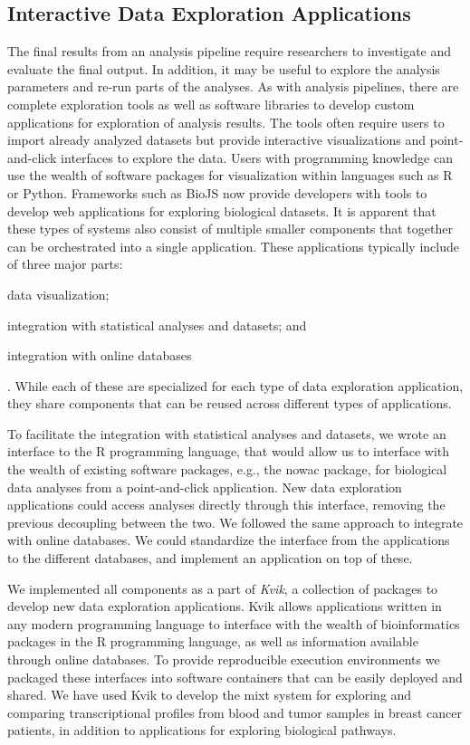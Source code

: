 \subsection{Interactive Data Exploration Applications}
The final results from an analysis pipeline require researchers to investigate
and evaluate the final output. In addition, it may be useful to explore the
analysis parameters and re-run parts of the analyses. 
As with analysis pipelines, there are complete exploration tools as
well as software libraries to develop custom applications for exploration of
analysis results. The tools often require users to import already analyzed
datasets but provide interactive visualizations and point-and-click interfaces
to explore the data. Users with programming knowledge can use the wealth of
software packages for visualization within languages such as R or Python.
Frameworks such as BioJS\cite{gomez2013biojs} now provide developers with tools
to develop web applications for exploring biological datasets. It is apparent
that 
these types of systems also consist of multiple smaller components that
together can be orchestrated into a single application. These applications
typically include of three major parts:
\begin{enumerate*}[label=(\roman*)]
    \item data visualization;
    \item integration with statistical analyses and datasets; and 
    \item integration with online databases
\end{enumerate*}. 
While each of these are specialized for each type of data exploration
application, they share components that can be reused across different types of
applications. 

To facilitate the integration with statistical analyses and datasets, we wrote
an interface to the R programming language, that would allow us to interface
with the wealth of existing software packages, e.g.,  the \gls{nowac} package,
for biological data analyses from a point-and-click application. New data
exploration applications could access analyses directly through this interface,
removing the previous decoupling between the two. We followed the same approach
to integrate with online databases. We could standardize the interface from the
applications to the different databases, and implement an application on top of
these. 

We implemented all components as a part of \emph{Kvik},\cite{fjukstad2015kvik} a
collection of packages to develop new data exploration applications. Kvik allows
applications written in any modern programming language to interface with the
wealth of bioinformatics packages in the R programming language, as well as
information available through online databases. To provide reproducible
execution environments we packaged these interfaces into  software containers
that can be easily deployed and shared.  We have used Kvik to develop the
\gls{mixt} system\cite{fjukstad2017building} for exploring and comparing
transcriptional profiles from blood and tumor samples in breast cancer patients,
in addition to applications for exploring biological
pathways\cite{fjukstad2015kvik}. 

